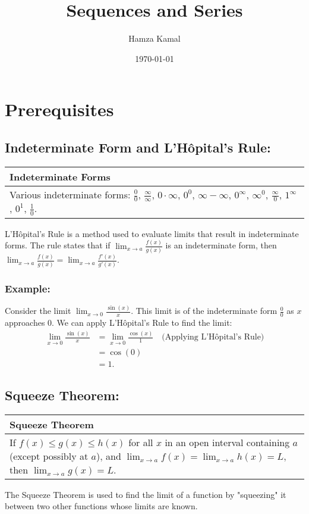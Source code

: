 \documentclass[12pt]{article}
\title{Sequences and Series}
\author{Hamza Kamal}
\date{\today}
\newcommand{\formula}[2]{
    {\renewcommand{\arraystretch}{2}
        \begin{center}
        \begin{tabular}{|p{0.9\textwidth}|}
        \hline
        \textbf{#1} \\
        \hline
        #2 \\
        \hline
        \end{tabular}
        \end{center}
    }
}
\begin{document}
\setlength{\jot}{10pt}

\begin{titlepage}
\maketitle
\thispagestyle{empty}
\end{titlepage}

\tableofcontents
\newpage

\section{Prerequisites}

\subsection{Indeterminate Form and  L'Hôpital's Rule: }
\formula{Indeterminate Forms}{
    Various indeterminate forms: $\frac{0}{0}$, $\frac{\infty}{\infty}$, $0 \cdot \infty$, $0^0$, $\infty - \infty$, $0^{\infty}$, $\infty^0$, $\frac{\infty}{0}$, $1^{\infty}$, $0^1$, $\frac{1}{0}$.
}
L'Hôpital's Rule is a method used to evaluate limits that result in indeterminate forms. The rule states that if $\lim_{x \to a} \frac{f(x)}{g(x)}$ is an indeterminate form, then $\lim_{x \to a} \frac{f(x)}{g(x)} = \lim_{x \to a} \frac{f'(x)}{g'(x)}$.
\subsubsection{Example:}
Consider the limit $\lim_{x \to 0} \frac{\sin(x)}{x}$. This limit is of the indeterminate form $\frac{0}{0}$ as $x$ approaches $0$. We can apply L'Hôpital's Rule to find the limit:
\[
\begin{aligned}
    \lim_{x \to 0} \frac{\sin(x)}{x} &= \lim_{x \to 0} \frac{\cos(x)}{1} \quad \text{(Applying L'Hôpital's Rule)} \\
    &= \cos(0) \\
    &= 1.
\end{aligned}
\]

\vspace{\baselineskip}

\subsection{Squeeze Theorem: }
\formula{Squeeze Theorem}{
    If $f(x) \leq g(x) \leq h(x)$ for all $x$ in an open interval containing $a$ (except possibly at $a$), and $\lim_{x \to a} f(x) = \lim_{x \to a} h(x) = L$, then $\lim_{x \to a} g(x) = L$.
}
The Squeeze Theorem is used to find the limit of a function by "squeezing" it between two other functions whose limits are known.
\end{document}
